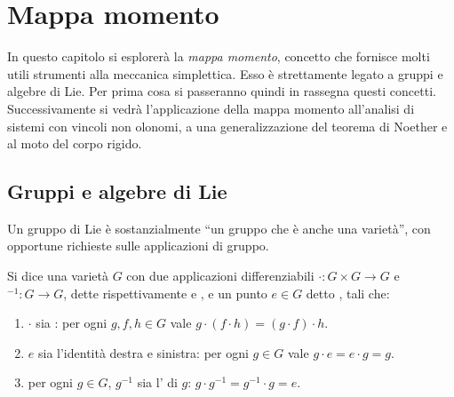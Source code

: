 \chapter{Mappa momento}
In questo capitolo si esplorerà la \emph{mappa momento}, concetto che fornisce molti utili strumenti alla meccanica simplettica. Esso è strettamente legato a gruppi e algebre di Lie. Per prima cosa si passeranno quindi in rassegna questi concetti. Successivamente si vedrà l'applicazione della mappa momento all'analisi di sistemi con vincoli non olonomi, a una generalizzazione del teorema di Noether e al moto del corpo rigido.

\section{Gruppi e algebre di Lie}
Un gruppo di Lie è sostanzialmente \textquotedblleft un gruppo che è anche una varietà\textquotedblright, con opportune richieste sulle applicazioni di gruppo.
\begin{definition}
  Si dice  una varietà $G$ con due applicazioni differenziabili $\cdot: G \times G \to G$ e ${}^{-1}: G\to G$, dette rispettivamente  e , e un punto $e \in G$ detto , tali che:
  \begin{enumerate}
    \item $\cdot $ sia : per ogni $g,f,h \in G$ vale $g\cdot (f\cdot h) = (g\cdot f) \cdot h$.
    \item $e$ sia l'identità destra e sinistra: per ogni $g \in G$ vale $g \cdot e = e \cdot g = g$.
    \item per ogni $g \in G$, $g^{-1}$ sia l' di $g$: $g \cdot g^{-1} = g^{-1}\cdot g = e$.
  \end{enumerate}
\end{definition}

